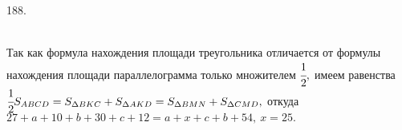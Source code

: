 188. \begin{figure}[ht!]
\end{figure}\\
Так как формула нахождения площади треугольника отличается от формулы нахождения площади параллелограмма только множителем $\cfrac{1}{2},$ имеем равенства
$\cfrac{1}{2}S_{ABCD}=S_{\Delta BKC}+S_{\Delta AKD}=S_{\Delta BMN}+S_{\Delta CMD},$ откуда $27+a+10+b+30+c+12=a+x+c+b+54,\ x=25.$\\

